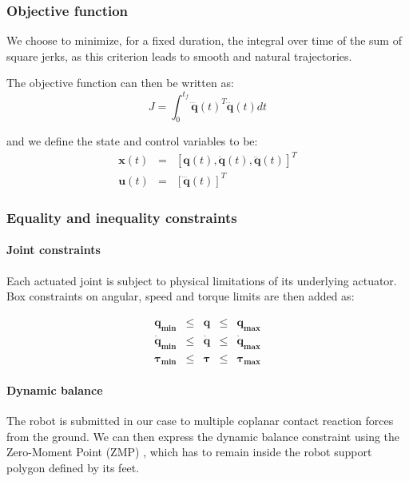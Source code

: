 \subsubsection{Objective function}

We choose to minimize, for a fixed duration, the integral over time of
the sum of square jerks, as this criterion leads to smooth and natural
trajectories.

The objective function can then be written as:
\begin{equation}
  J = \int_{0}^{t_{f}}\mathbf{\dddot{q}}(t)^T\mathbf{\dddot{q}}(t) dt
  \label{objective-function}
\end{equation}

and we define the state and control variables to be:
\begin{equation}
  \begin{array}{rcl}
  \mathbf{x}(t) & = & [\mathbf{q}(t), \mathbf{\dot{q}}(t), \mathbf{\ddot{q}}(t)]^T \\
  \mathbf{u}(t) & = & [\mathbf{\dddot{q}}(t)]^T
  \end{array}
  \label{variables}
\end{equation}

\subsubsection{Equality and inequality constraints}

\paragraph{Joint constraints}
Each actuated joint is subject to physical limitations of its
underlying actuator. Box constraints on angular, speed and torque
limits are then added as:

\begin{equation}
  \begin{array}{rcccl}
    \mathbf{q_{min}} & \le & \mathbf{q} & \le & \mathbf{q_{max}} \\
    \mathbf{\dot{q}_{min}} & \le & \mathbf{\dot{q}} & \le & \mathbf{\dot{q}_{max}} \\
    \mathbf{\tau_{min}} & \le & \mathbf{\tau} & \le & \mathbf{\tau_{max}}
  \end{array}
  \label{joint-constraints}
\end{equation}

\paragraph{Dynamic balance}
The robot is submitted in our case to multiple coplanar contact
reaction forces from the ground. We can then express the dynamic
balance constraint using the Zero-Moment Point (ZMP)
\cite{Vukobratovic2004zero}, which has to remain inside the robot
support polygon defined by its feet.

